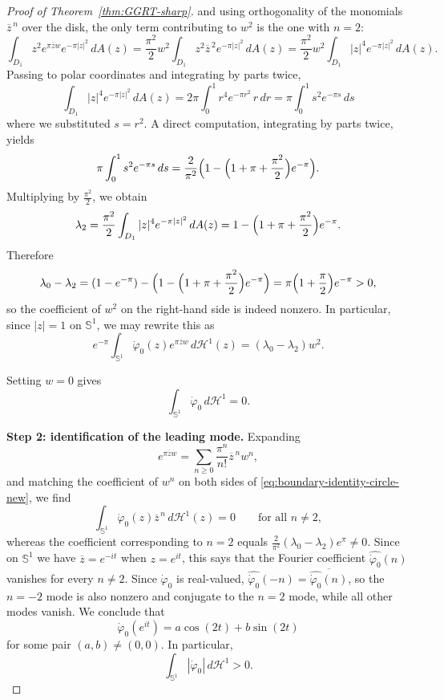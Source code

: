 \begin{proof}[Proof of Theorem~\ref{thm:GGRT-sharp}]
and using orthogonality of the monomials \(\overline z^{\,n}\) over the disk,
the only term contributing to \(w^2\) is the one with \(n=2\):
\[
\int_{D_1} z^2 e^{\pi \overline zw}e^{-\pi|z|^2}\,dA(z)
=
\frac{\pi^2}{2}w^2\int_{D_1}z^2\overline z^{\,2}e^{-\pi|z|^2}\,dA(z)
=
\frac{\pi^2}{2}w^2\int_{D_1}|z|^4 e^{-\pi|z|^2}\,dA(z).
\]
Passing to polar coordinates and integrating by parts twice,
\[
\int_{D_1}|z|^4 e^{-\pi|z|^2}\,dA(z)
=
2\pi\int_0^1 r^4 e^{-\pi r^2}\,r\,dr
=
\pi\int_0^1 s^2 e^{-\pi s}\,ds
\]
where we substituted \(s=r^2\). A direct computation, integrating by parts
twice, yields
\[
\pi\int_0^1 s^2 e^{-\pi s}\,ds
=
\frac{2}{\pi^2}\Bigl(1-\Bigl(1+\pi+\frac{\pi^2}{2}\Bigr)e^{-\pi}\Bigr).
\]
Multiplying by \(\frac{\pi^2}{2}\), we obtain
\[
\lambda_2
=
\frac{\pi^2}{2}\int_{D_1}|z|^4e^{-\pi|z|^2}\,dA(z)
=
1-\Bigl(1+\pi+\frac{\pi^2}{2}\Bigr)e^{-\pi}.
\]
Therefore
\[
\lambda_0-\lambda_2
=
(1-e^{-\pi})-\Bigl(1-\Bigl(1+\pi+\frac{\pi^2}{2}\Bigr)e^{-\pi}\Bigr)
=
\pi\Bigl(1+\frac{\pi}{2}\Bigr)e^{-\pi}>0,
\]
so the coefficient of \(w^2\) on the right-hand side is indeed nonzero.
In particular, since $|z|=1$ on $\mathbb S^1$, we may rewrite this as
\begin{equation}\label{eq:boundary-identity-circle-new}
e^{-\pi}
\int_{\mathbb S^1}
\dot\varphi_0(z)e^{\pi \overline zw}\,d\mathcal H^1(z)
=
(\lambda_0-\lambda_2)w^2.
\end{equation}

Setting $w=0$ gives
\begin{equation}\label{eq:cancellation-f-0-new}
\int_{\mathbb S^1}\dot\varphi_0\,d\mathcal H^1=0.
\end{equation}

\medskip
\noindent
{\bf Step 2: identification of the leading mode.} Expanding
\[
e^{\pi \overline zw}
=
\sum_{n\geq 0}\frac{\pi^n}{n!}\overline z^{\,n}w^n,
\]
and matching the coefficient of $w^n$ on both sides of
\eqref{eq:boundary-identity-circle-new}, we find
\[
\int_{\mathbb S^1}\dot\varphi_0(z)\overline z^{\,n}\,d\mathcal H^1(z)=0
\qquad \text{for all } n\neq 2,
\]
whereas the coefficient corresponding to $n=2$ equals
$\frac{2}{\pi^2}(\lambda_0-\lambda_2)e^\pi\neq 0$. Since on $\mathbb S^1$
we have $\overline z=e^{-it}$ when $z=e^{it}$, this says that the Fourier
coefficient $\widehat{\dot\varphi_0}(n)$ vanishes for every $n\neq 2$. Since
$\dot\varphi_0$ is real-valued, $\widehat{\dot\varphi_0}(-n)
=\overline{\widehat{\dot\varphi_0}(n)}$, so the $n=-2$ mode is also nonzero
and conjugate to the $n=2$ mode, while all other modes vanish. We conclude
that
\begin{equation}\label{eq:mode-decomposition-new}
\dot\varphi_0(e^{it})
=
a\cos(2t)+b\sin(2t)
\end{equation}
for some pair $(a,b)\neq (0,0)$. In particular,
\begin{equation}\label{eq:l1-nontrivial-new}
\int_{\mathbb S^1} |\dot\varphi_0|\,d\mathcal H^1>0.
\end{equation}


\end{proof}
